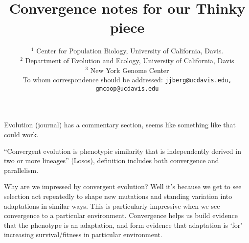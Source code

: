 \documentclass[a4paper,10pt]{article}
\begin{document}
\title{Convergence notes for our Thinky piece}

\author{
$^1$ Center for Population Biology, University of California, Davis.\\
$^2$ Department of Evolution and Ecology, University of California, Davis\\
$^3$ New York Genome Center\\
\small To whom correspondence should be addressed: \texttt{jjberg@ucdavis.edu, gmcoop@ucdavis.edu}\\
}

\maketitle

Evolution (journal) has a commentary section, seems like something like that could work.



``Convergent evolution is phenotypic similarity that is independently
derived in two or more lineages'' (Losos), definition includes both
convergence and parallelism. 

Why are we impressed by convergent evolution? Well it's because we get
to see selection act repeatedly to shape new mutations and standing
variation into adaptations in similar ways. This is particularly
impressive when we see convergence to a particular environment. Convergence helps us build
evidence that the phenotype is an adaptation, and form evidence that
adaptation is `for' increasing survival/fitness in particular
environment. 
\end{document}

